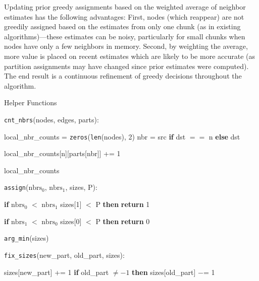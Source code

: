 Updating prior greedy assignments based on the weighted average of neighbor estimates has the following advantages: First, nodes (which reappear) are not greedily assigned based on the estimates from only one chunk (as in existing algorithms)---these estimates can be noisy, particularly for small chunks when nodes have only a few neighbors in memory. Second, by weighting the average, more value is placed on recent estimates which are likely to be more accurate (as partition assignments may have changed since prior estimates were computed). The end result is a continuous refinement of greedy decisions throughout the algorithm.



\begin{algorithm}[t]\small
    \caption{\partitioning Helper Functions}
    \label{alg:partition_algo_helpers}
    
    \begin{algorithmic}[1]

    \STATE \texttt{cnt\_nbrs}(nodes, edges, parts):
    \begin{ALC@g}
        \STATE local\_nbr\_counts = \texttt{zeros}(\texttt{len}(nodes), 2)
                    \STATE nbr = src \textbf{if} dst $==$ n \textbf{else} dst
                    
                        \STATE local\_nbr\_counts[n][parts[nbr]] += 1
                    \ENDIF
   
                \ENDIF
            \ENDFOR
        \ENDFOR
        \RETURN local\_nbr\_counts
    \end{ALC@g}

    \STATE \texttt{assign}($\text{nbrs}_0$, $\text{nbrs}_1$, sizes, P):
    \begin{ALC@g}
        \STATE \textbf{if} $\text{nbrs}_0$ $<$ $\text{nbrs}_1$ \AND sizes[1] $<$ P \textbf{then} \textbf{return} 1

        \STATE \textbf{if} $\text{nbrs}_1$ $<$ $\text{nbrs}_0$ \AND sizes[0] $<$ P \textbf{then} \textbf{return} 0

        \RETURN \texttt{arg\_min}(sizes)
        
    \end{ALC@g}

    \STATE \texttt{fix\_sizes}(new\_part, old\_part, sizes):
    \begin{ALC@g}
        \STATE sizes[new\_part] += 1
        \STATE \textbf{if} old\_part $\neq -1$ \textbf{then} sizes[old\_part] $-$= 1
    \end{ALC@g}
    
    \end{algorithmic}
    
\end{algorithm}





